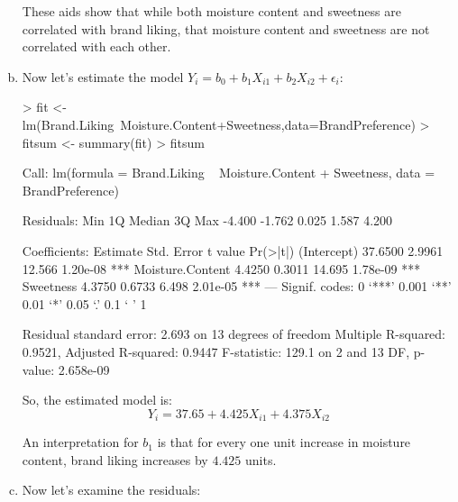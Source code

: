 \documentclass{article}
\begin{document}
\begin{enumerate}[a)]
These aids show that while both moisture content and sweetness are correlated with brand liking, that moisture content and sweetness are not correlated with each other.

\item{} Now let's estimate the model $Y_i = b_0 + b_1X_{i1} + b_2X_{i2} + \epsilon{}_i$:
\begin{Schunk}
\begin{Sinput}
> fit <- lm(Brand.Liking~Moisture.Content+Sweetness,data=BrandPreference)
> fitsum <- summary(fit)
> fitsum
\end{Sinput}
\begin{Soutput}
Call:
lm(formula = Brand.Liking ~ Moisture.Content + Sweetness, data = BrandPreference)

Residuals:
   Min     1Q Median     3Q    Max 
-4.400 -1.762  0.025  1.587  4.200 

Coefficients:
                 Estimate Std. Error t value Pr(>|t|)    
(Intercept)       37.6500     2.9961  12.566 1.20e-08 ***
Moisture.Content   4.4250     0.3011  14.695 1.78e-09 ***
Sweetness          4.3750     0.6733   6.498 2.01e-05 ***
---
Signif. codes:  0 ‘***’ 0.001 ‘**’ 0.01 ‘*’ 0.05 ‘.’ 0.1 ‘ ’ 1

Residual standard error: 2.693 on 13 degrees of freedom
Multiple R-squared:  0.9521,	Adjusted R-squared:  0.9447 
F-statistic: 129.1 on 2 and 13 DF,  p-value: 2.658e-09
\end{Soutput}
\end{Schunk}

So, the estimated model is:
$$ Y_i = 37.65 + 4.425X_{i1} + 4.375X_{i2} $$

An interpretation for $b_1$ is that for every one unit increase in moisture content, brand liking increases by $4.425$ units.

\item{} Now let's examine the residuals:


\end{enumerate}
\end{document}
